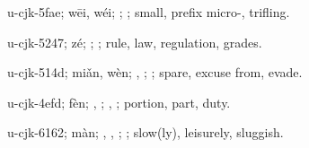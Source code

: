 \begin{multicols}{2}
{\cjkgGlue{}u-cjk-5fae; wēi, wéi; \cjkgGlue{}\cjkgGlue{}\cjkgGlue{}; \cjkgGlue{}; small, prefix micro-, trifling.

\cjkgGlue{}u-cjk-5247; zé; \cjkgGlue{}\cjkgGlue{}\cjkgGlue{}; \cjkgGlue{}; rule, law, regulation, grades.

\cjkgGlue{}u-cjk-514d; miǎn, wèn; \cjkgGlue{}\cjkgGlue{}\cjkgGlue{}, \cjkgGlue{}\cjkgGlue{}\cjkgGlue{}; \cjkgGlue{}; spare, excuse from, evade.

\cjkgGlue{}u-cjk-4efd; fèn; \cjkgGlue{}\cjkgGlue{}\cjkgGlue{}, \cjkgGlue{}\cjkgGlue{}\cjkgGlue{}; \cjkgGlue{}, \cjkgGlue{}; portion, part, duty.

\cjkgGlue{}u-cjk-6162; màn; \cjkgGlue{}, \cjkgGlue{}, \cjkgGlue{}; \cjkgGlue{}; slow(ly), leisurely, sluggish.

}
\end{multicols}
